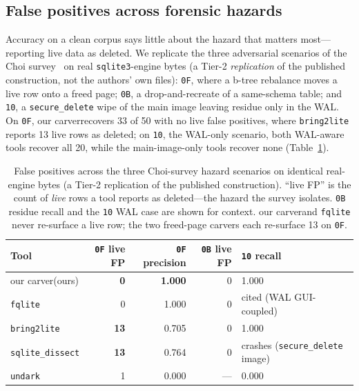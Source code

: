 \documentclass[10pt,a4paper]{article}
\newcommand{\code}[1]{\texttt{#1}}
\newcommand{\sys}{our carver}
\newcommand{\sys}{\texttt{sqlite4n6}}
\begin{document}
\subsection*{False positives across forensic hazards}
Accuracy on a clean corpus says little about the hazard that matters most---reporting
live data as deleted. We replicate the three adversarial scenarios of the Choi
survey~\cite{choi2025survey} on real \code{sqlite3}-engine bytes (a Tier-2
\emph{replication} of the published construction, not the authors' own files):
\code{0F}, where a b-tree rebalance moves a live row onto a freed page; \code{0B}, a
drop-and-recreate of a same-schema table; and \code{10}, a \code{secure\_delete}
wipe of the main image leaving residue only in the WAL. On \code{0F},
\sys recovers 33 of 50 with no live false positives, where
\code{bring2lite} reports 13 live rows as deleted; on \code{10}, the WAL-only
scenario, both WAL-aware tools recover all 20, while the main-image-only tools
recover none (Table~\ref{tab:fp}).

\begin{table}[t]
\centering\small
\caption{False positives across the three Choi-survey hazard scenarios on identical
real-engine bytes (a Tier-2 replication of the published construction). ``live FP'' is
the count of \emph{live} rows a tool reports as deleted---the hazard the survey isolates.
\code{0B} residue recall and the \code{10} WAL case are shown for context.
\sys and \code{fqlite} never re-surface a live row; the two freed-page carvers each
re-surface 13 on \code{0F}.}
\label{tab:fp}
\setlength{\tabcolsep}{6pt}
\begin{tabular}{@{}lrrrl@{}}
\toprule
Tool & \code{0F} live FP & \code{0F} precision & \code{0B} live FP & \code{10} recall \\
\midrule
\sys (ours)            & \textbf{0}  & \textbf{1.000} & 0   & 1.000 \\
\code{fqlite}          & 0           & 1.000          & 0   & cited (WAL GUI-coupled) \\
\code{bring2lite}      & \textbf{13} & 0.705          & 0   & 1.000 \\
\code{sqlite\_dissect} & \textbf{13} & 0.764          & 0   & crashes (\code{secure\_delete} image) \\
\code{undark}          & 1           & 0.000          & --- & 0.000 \\
\bottomrule
\end{tabular}
\end{table}
\end{document}
